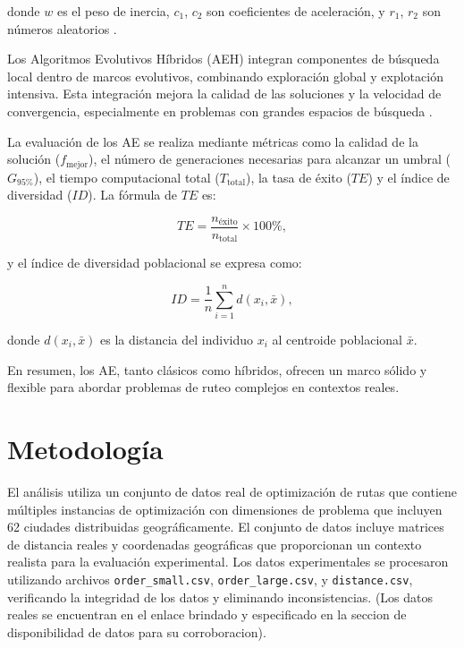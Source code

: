 \documentclass[conference]{IEEEtran}
\begin{document}
donde $w$ es el peso de inercia, $c_1$, $c_2$ son coeficientes de aceleración, y $r_1$, $r_2$ son números aleatorios \cite{clerc2002}.

Los Algoritmos Evolutivos Híbridos (AEH) integran componentes de búsqueda local dentro de marcos evolutivos, combinando exploración global y explotación intensiva. Esta integración mejora la calidad de las soluciones y la velocidad de convergencia, especialmente en problemas con grandes espacios de búsqueda \cite{alba2013}.

La evaluación de los AE se realiza mediante métricas como la calidad de la solución ($f_{\text{mejor}}$), el número de generaciones necesarias para alcanzar un umbral ($G_{95\%}$), el tiempo computacional total ($T_{\text{total}}$), la tasa de éxito ($TE$) y el índice de diversidad ($ID$). La fórmula de $TE$ es:

\begin{equation}
TE = \frac{n_{\text{éxito}}}{n_{\text{total}}} \times 100\%,
\end{equation}

y el índice de diversidad poblacional se expresa como:

\begin{equation}
ID = \frac{1}{n} \sum_{i=1}^{n} d(x_i, \bar{x}),
\end{equation}

donde $d(x_i, \bar{x})$ es la distancia del individuo $x_i$ al centroide poblacional $\bar{x}$.

En resumen, los AE, tanto clásicos como híbridos, ofrecen un marco sólido y flexible para abordar problemas de ruteo complejos en contextos reales.

\section{Metodología}

El análisis utiliza un conjunto de datos real de optimización de rutas que contiene múltiples instancias de optimización con dimensiones de problema que incluyen 62 ciudades distribuidas geográficamente. El conjunto de datos incluye matrices de distancia reales y coordenadas geográficas que proporcionan un contexto realista para la evaluación experimental. Los datos experimentales se procesaron utilizando archivos \texttt{order\_small.csv}, \texttt{order\_large.csv}, y \texttt{distance.csv}, verificando la integridad de los datos y eliminando inconsistencias. (Los datos reales se encuentran en el enlace brindado y especificado en la seccion de disponibilidad de datos para su corroboracion).
\end{document}
